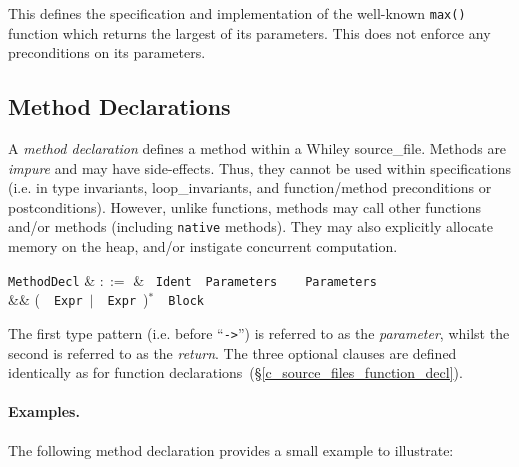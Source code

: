 

This defines the specification and implementation of the well-known \lstinline{max()} function which returns the largest of its parameters. This does not enforce any preconditions on its parameters.


\subsection{Method Declarations}
\label{c_source_files_method_decl}

A {\em method declaration} defines a method within a Whiley \gls{source_file}.  Methods are {\em impure} and may have side-effects.  Thus, they cannot be used within specifications (i.e. in type invariants, \gls{loop_invariant}s, and function/method \gls{precondition}s or \gls{postcondition}s).  However, unlike functions, methods may call other functions and/or methods (including \lstinline{native} methods).  They may also explicitly allocate memory on the heap, and/or instigate concurrent computation.

\begin{syntax}
  \verb+MethodDecl+ & $::=$ & \ \verb+Ident+\ \token{(}\ \verb+Parameters+\ \token{)}\ \token{->}\ \token{(}\ \verb+Parameters+\ \token{)}\\
  && \big(\ \ \verb+Expr+\ $|$\ \ \verb+Expr+\ \big)$^*$\ \token{:}\ \verb+Block+\\
\end{syntax}

The first type pattern (i.e. before ``\lstinline{->}'') is referred to as the {\em parameter}, whilst the second is referred to as the {\em   return}.  The three optional clauses are defined identically as for function declarations~(\S\ref{c_source_files_function_decl}).

\paragraph{Examples.}  The following method declaration provides a
small example to illustrate:







